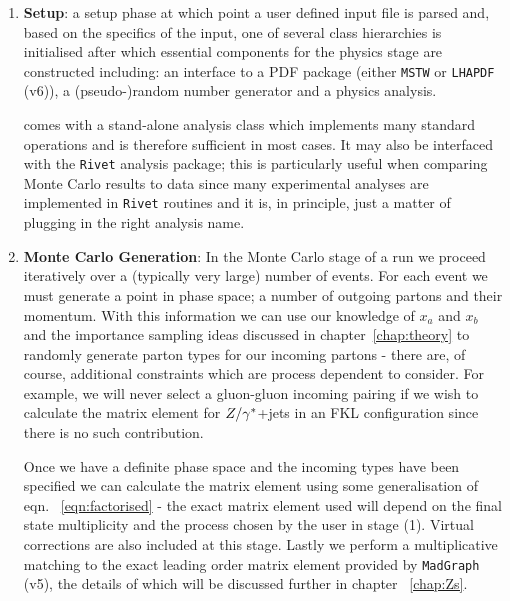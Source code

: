 		\begin{enumerate}
			\item \textbf{Setup}: a setup phase at which point a user defined input file is parsed
			and, based on the specifics of the input, one of several class hierarchies is
			initialised after which essential components for the physics stage are constructed including:
			an interface to a PDF package (either \texttt{MSTW} or \texttt{LHAPDF} (v6)), a
			(pseudo-)random number generator and a physics analysis.

			\HEJ comes with a stand-alone analysis class which implements many standard operations
			and is therefore sufficient in most cases.  It may also be interfaced with the
			\texttt{Rivet} analysis package; this is particularly useful when comparing Monte
			Carlo results to data since many experimental analyses are implemented in \texttt{Rivet}
			routines and it is, in principle, just a matter of plugging in the right analysis name.

			\item \textbf{Monte Carlo Generation}: In the Monte Carlo stage of a \HEJ run we
			proceed iteratively over a (typically very large) number of events.  For each
			event we must generate a point in phase space; a number of outgoing partons and their
			momentum.  With this information we can use our knowledge of $x_a$
			and $x_b$ and the importance sampling ideas discussed in chapter~\ref{chap:theory}
			to randomly generate parton types for our incoming partons - there are, of course,
			additional constraints which are process dependent to consider.  For example, we
			will never select a gluon-gluon incoming pairing if we wish to calculate the matrix
			element for $Z/\gamma^*$+jets in an FKL configuration since there is no such contribution.

			Once we have a definite phase space and the incoming types have been
			specified we can calculate the matrix element using some generalisation of eqn.
			~\eqref{eqn:factorised} - the exact matrix element used will depend on the
			final state multiplicity and the process chosen by the user in stage (1).  Virtual
			corrections are also included at this stage.  Lastly we perform a
			multiplicative matching to the exact leading order matrix element provided by
			\texttt{MadGraph} (v5), the details of which will be discussed further in chapter
			~\ref{chap:Zs}.


\end{enumerate}

